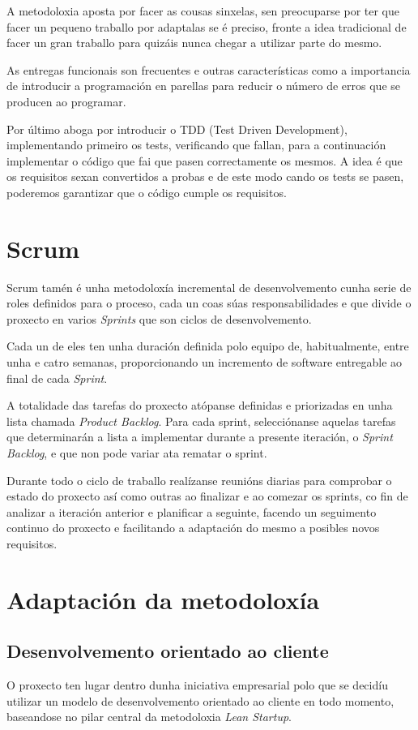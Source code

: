   A metodoloxia aposta por facer as cousas sinxelas, sen preocuparse por ter 
que facer un pequeno traballo por adaptalas se é preciso, fronte a idea 
tradicional de facer un gran traballo para quizáis nunca chegar a utilizar 
parte do mesmo.

  As entregas funcionais son frecuentes e outras características como a 
importancia de introducir a programación en parellas para reducir o número de 
erros que se producen ao programar.

  Por último aboga por introducir o TDD (Test Driven Development), 
implementando primeiro os tests, verificando que fallan, para a continuación 
implementar o código que fai que pasen correctamente os mesmos.
  A idea é que os requisitos sexan convertidos a probas e de este modo cando os 
tests se pasen, poderemos garantizar que o código cumple os requisitos.

  \section{Scrum}
  Scrum\cite{book:scrum} tamén é unha metodoloxía incremental de desenvolvemento 
cunha serie de roles definidos para o proceso, cada un coas súas 
responsabilidades e que divide o proxecto en varios \emph{Sprints} que son 
ciclos de desenvolvemento.

  Cada un de eles ten unha duración definida polo equipo de, habitualmente, 
entre unha e catro semanas, proporcionando un incremento de software entregable 
ao final de cada \emph{Sprint}.

  A totalidade das tarefas do proxecto atópanse definidas e priorizadas en unha 
lista chamada \emph{Product Backlog}. Para cada sprint, selecciónanse aquelas 
tarefas que determinarán a lista a implementar durante a presente iteración, o
\emph{Sprint Backlog}, e que non pode variar ata rematar o sprint.

  Durante todo o ciclo de traballo realízanse reunións diarias para comprobar o 
estado do proxecto así como outras ao finalizar e ao comezar os sprints, co 
fin de analizar a iteración anterior e planificar a seguinte, facendo un 
seguimento continuo do proxecto e facilitando a adaptación do mesmo a posibles 
novos requisitos.

  \section{Adaptación da metodoloxía}

    \subsection{Desenvolvemento orientado ao cliente}
      O proxecto ten lugar dentro dunha iniciativa empresarial polo que se 
decidíu utilizar un modelo de desenvolvemento orientado ao cliente en todo 
momento, baseandose no pilar central da metodoloxia \emph{Lean Startup}.

